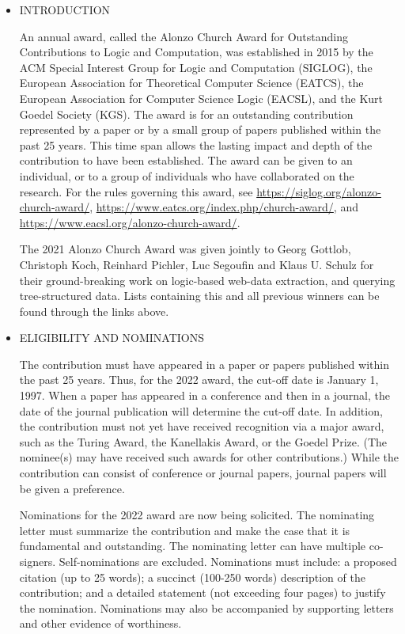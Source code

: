 \documentclass[prodmode,acmtecs]{acmsmall} %
\begin{document}
\begin{itemize}\item  INTRODUCTION 
 
  An annual award, called the Alonzo Church Award for Outstanding Contributions to Logic and Computation, was established in 2015 by the ACM Special Interest Group for Logic and Computation (SIGLOG), the European Association for Theoretical Computer Science (EATCS), the European Association for Computer Science Logic (EACSL), and the Kurt Goedel Society (KGS). The award is for an outstanding contribution represented by a paper or by a small group of papers published within the past 25 years. This time span allows the lasting impact and depth of the contribution to have been established. The award can be given to an individual, or to a group of individuals who have collaborated on the research. For the rules governing this award, see \href{https://siglog.org/alonzo-church-award/}{https://siglog.org/alonzo-church-award/}, \href{https://www.eatcs.org/index.php/church-award/}{https://www.eatcs.org/index.php/church-award/}, and \href{https://www.eacsl.org/alonzo-church-award/}{https://www.eacsl.org/alonzo-church-award/}. 
 
  The 2021 Alonzo Church Award was given jointly to Georg Gottlob, Christoph Koch, Reinhard Pichler, Luc Segoufin and Klaus U. Schulz for their ground-breaking work on logic-based web-data extraction, and querying tree-structured data. Lists containing this and all previous winners can be found through the links above.  
 
\item  ELIGIBILITY AND NOMINATIONS 
 
  The contribution must have appeared in a paper or papers published within the past 25 years. Thus, for the 2022 award, the cut-off date is January 1, 1997. When a paper has appeared in a conference and then in a journal, the date of the journal publication will determine the cut-off date. In addition, the contribution must not yet have received recognition via a major award, such as the Turing Award, the Kanellakis Award, or the Goedel Prize. (The nominee(s) may have received such awards for other contributions.) While the contribution can consist of conference or journal papers, journal papers will be given a preference. 
 
  Nominations for the 2022 award are now being solicited. The nominating letter must summarize the contribution and make the case that it is fundamental and outstanding. The nominating letter can have multiple co-signers. Self-nominations are excluded. Nominations must include: a proposed citation (up to 25 words); a succinct (100-250 words) description of the contribution; and a detailed statement (not exceeding four pages) to justify the nomination. Nominations may also be accompanied by supporting letters and other evidence of worthiness. 
 

\end{itemize}
\end{document}
